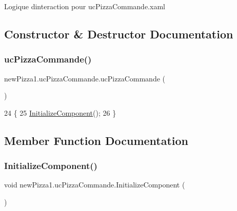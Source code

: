 Logique d\textquotesingle{}interaction pour uc\+Pizza\+Commande.\+xaml 

\subsection{Constructor \& Destructor Documentation}
\mbox{\label{classnewPizza1_1_1ucPizzaCommande_ae864312c0544be9c10f461fda4213240}} 
\subsubsection{\texorpdfstring{uc\+Pizza\+Commande()}{ucPizzaCommande()}}
{\footnotesize\ttfamily new\+Pizza1.\+uc\+Pizza\+Commande.\+uc\+Pizza\+Commande (\begin{DoxyParamCaption}{ }\end{DoxyParamCaption})\hspace{0.3cm}{\ttfamily [inline]}}


\begin{DoxyCode}
24         \{
25             \hyperlink{classnewPizza1_1_1ucPizzaCommande_a64b08961b7d2239fe9cf481dad628572}{InitializeComponent}();
26         \}
\end{DoxyCode}


\subsection{Member Function Documentation}
\mbox{\label{classnewPizza1_1_1ucPizzaCommande_a64b08961b7d2239fe9cf481dad628572}} 
\subsubsection{\texorpdfstring{Initialize\+Component()}{InitializeComponent()}\hspace{0.1cm}{\footnotesize\ttfamily [1/4]}}
{\footnotesize\ttfamily void new\+Pizza1.\+uc\+Pizza\+Commande.\+Initialize\+Component (\begin{DoxyParamCaption}{ }\end{DoxyParamCaption})\hspace{0.3cm}{\ttfamily [inline]}}



